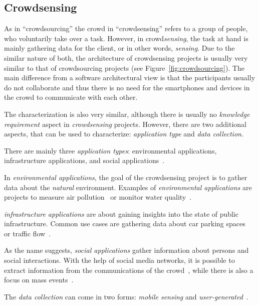 \subsection*{Crowdsensing}
As in ``crowdsourcing'' the crowd in ``crowdsensing'' refers to a group of people, who voluntarily take over a task.
However, in crowd\textit{sensing}, the task at hand is mainly gathering data for the client, or in other words, \textit{sensing}.
Due to the similar nature of both, the architecture of crowdsensing projects is usually very similar to that of crowdsourcing projects (see Figure~\ref{fig:crowdsourcing}).
The main difference from a software architectural view is that the participants usually do not collaborate and thus there is no need for the smartphones and devices in the crowd to communicate with each other.

The characterization is also very similar, although there is usually no \textit{knowledge requirement} aspect in \textit{crowdsensing} projects.
However, there are two additional aspects, that can be used to characterize: \textit{application type} and \textit{data collection}.

There are mainly three \textit{application types}: environmental applications, infrastructure applications, and social applications~\cite{ganti2011mobile}.

In \textit{environmental applications}, the goal of the crowdsensing project is to gather data about the \textit{natural} environment.
Examples of \textit{environmental applications} are projects to measure air pollution~\cite{hasenfratz2012participatory,sivaraman2013hazewatch,liu2018third} or monitor water quality~\cite{minkman2015citizen,rapousis2016performance,shang2023crowdwatersens}.

\textit{infrastructure applications} are about gaining insights into the state of public infrastructure.
Common use cases are gathering data about car parking spaces~\cite{villanueva2015crowdsensing,coric2013crowdsensing,rinne2014mobile} or traffic flow~\cite{wang2018city,li2019privacy,mei2020towards}.

As the name suggests, \textit{social applications} gather information about persons and social interactions.
With the help of social media networks, it is possible to extract information from the communications of the crowd~\cite{grasso2017public,cecilia2020mobile,phan2019drinks}, while there is also a focus on mass events~\cite{rahman2017location,cardone2014crowdsensing,jarvis2013ubicomp}.

The \textit{data collection} can come in two forms: \textit{mobile sensing} and \textit{user-generated}~\cite{pietschmann2008croco}.

